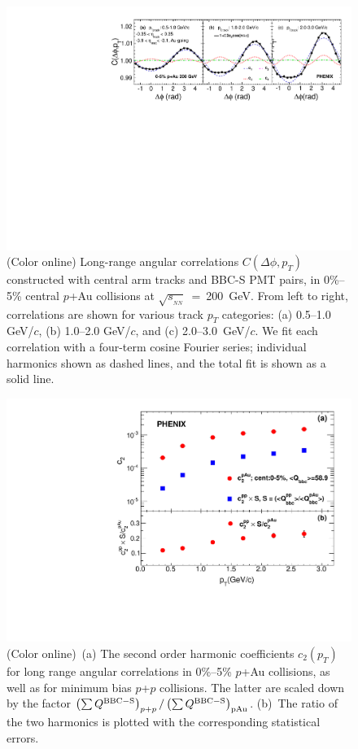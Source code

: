 \documentclass[%
reprint,
showpacs,preprintnumbers,
 amsmath,amssymb,
 aps,
]{revtex4-1}
\newcommand{\pt}{\mbox{$p_T$}\xspace}
\newcommand{\sqsn}{\mbox{$\sqrt{s_{_{NN}}}$}\xspace}
\newcommand{\pau}{\mbox{$p$+Au}\xspace}
\newcommand{\pp}{\mbox{$p$+$p$}\xspace}
\begin{document}
\begin{figure}[htbp]
  \includegraphics[scale=0.8]{Figures/figure1.pdf}
  \caption{(Color online) Long-range angular correlations $C(\Delta\phi,p_{T})$ constructed with central arm tracks and BBC-S PMT pairs, in 0\%--5\% central \pau collisions at \sqsn~=~200~GeV. From left to right,
correlations are shown for various track \pt categories: (a) 0.5--1.0 GeV/$c$, (b) 1.0--2.0 GeV/$c$, and (c) 2.0--3.0~GeV/$c$. We fit each correlation with a four-term cosine Fourier series; individual harmonics shown as dashed lines, and the total fit is shown as a solid line.}
\label{fig:figure1}
\end{figure}

\begin{figure}[htbp]
  \includegraphics[scale=0.45]{Figures/figure2.pdf}
  \caption{(Color online)~(a) The second order harmonic coefficients $c_2(p_T)$ for long range angular correlations in
0\%--5\% \pau collisions, as well as for minimum bias \pp collisions. The latter are scaled down by the factor $\left( \sum Q^{{\rm BBC-S}} \right)_{p+p} / \left( \sum Q^{{\rm
BBC-S}} \right)_{{\rm pAu}}$. (b)~The
ratio of the two harmonics is plotted with the corresponding statistical errors.
}
\label{fig:figure2}
\end{figure}
\end{document}

